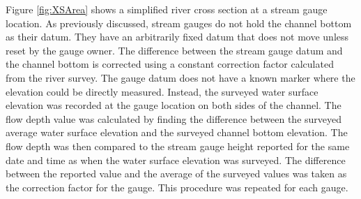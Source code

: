 \begin{linenumbers}
Figure \ref{fig:XSArea} shows a simplified river cross section at a stream gauge location.  As previously discussed, stream gauges do not hold the channel bottom as their datum.  They have an arbitrarily fixed datum that does not move unless reset by the gauge owner.  The difference between the stream gauge datum and the channel bottom is corrected using a constant correction factor calculated from the river survey.  The gauge datum does not have a known marker where the elevation could be directly measured.  Instead, the surveyed water surface elevation was recorded at the gauge location on both sides of the channel.  The flow depth value was calculated by finding the difference between the surveyed average water surface elevation and the surveyed channel bottom elevation.  The flow depth was then compared to the stream gauge height reported for the same date and time as when the water surface elevation was surveyed.  The difference between the reported value and the average of the surveyed values was taken as the correction factor for the gauge.  This procedure was repeated for each gauge.


\end{linenumbers}
